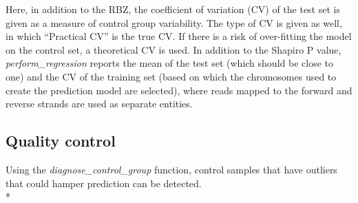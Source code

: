 \noindent Here, in addition to the RBZ, the coefficient of variation (CV) of the test set is given as a measure of control group variability. 
The type of CV is given as well, in which “Practical CV” is the true CV. If there is a risk of over-fitting the model on the control set, a theoretical CV is used. 
In addition to the Shapiro P value, \textsl{perform\_regression} reports the mean of the test set (which should be close to one) and the CV of the training set (based on which the chromosomes used to create the prediction model are selected), where reads mapped to the forward and reverse strands are used as separate entities.

\subsection{Quality control}
Using the \textsl{diagnose\_control\_group} function, control samples that have outliers that could hamper prediction can be detected. \\*  \vspace{-\baselineskip}


